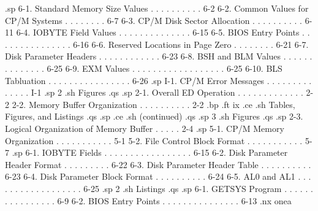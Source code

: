 .sp
     6-1.   Standard Memory Size Values . . . . . . . . . .   6-2
     6-2.   Common Values for CP/M Systems  . . . . . . . .   6-7
     6-3.   CP/M Disk Sector Allocation . . . . . . . . . .  6-11
     6-4.   IOBYTE Field Values . . . . . . . . . . . . . .  6-15
     6-5.   BIOS Entry Points . . . . . . . . . . . . . . .  6-16
     6-6.   Reserved Locations in Page Zero . . . . . . . .  6-21
     6-7.   Disk Parameter Headers  . . . . . . . . . . . .  6-23
     6-8.   BSH and BLM Values  . . . . . . . . . . . . . .  6-25
     6-9.   EXM Values  . . . . . . . . . . . . . . . . . .  6-25
     6-10.  BLS Tabluation  . . . . . . . . . . . . . . . .  6-26
.sp
     I-1.   CP/M Error Messages . . . . . . . . . . . . . .   I-1
.sp 2
.sh
Figures
.qs
.sp
     2-1.   Overall ED Operation  . . . . . . . . . . . . .   2-2
     2-2.   Memory Buffer Organization  . . . . . . . . . .   2-2
.bp
.ft                                ix
.ce
.sh
Tables, Figures, and Listings
.qs
.sp
.ce
.sh
(continued)
.qs
.sp 3
.sh
Figures
.qs
.sp
     2-3.   Logical Organization of Memory Buffer . . . . .   2-4
.sp
     5-1.   CP/M Memory Organization  . . . . . . . . . . .   5-1
     5-2.   File Control Block Format . . . . . . . . . . .   5-7
.sp
     6-1.   IOBYTE Fields . . . . . . . . . . . . . . . . .  6-15
     6-2.   Disk Parameter Header Format  . . . . . . . . .  6-22
     6-3.   Disk Parameter Header Table . . . . . . . . . .  6-23
     6-4.   Disk Parameter Block Format . . . . . . . . . .  6-24
     6-5.   AL0 and AL1 . . . . . . . . . . . . . . . . . .  6-25
.sp 2
.sh
Listings
.qs
.sp
     6-1.   GETSYS Program  . . . . . . . . . . . . . . . .   6-9
     6-2.   BIOS Entry Points . . . . . . . . . . . . . . .  6-13
.nx onea

